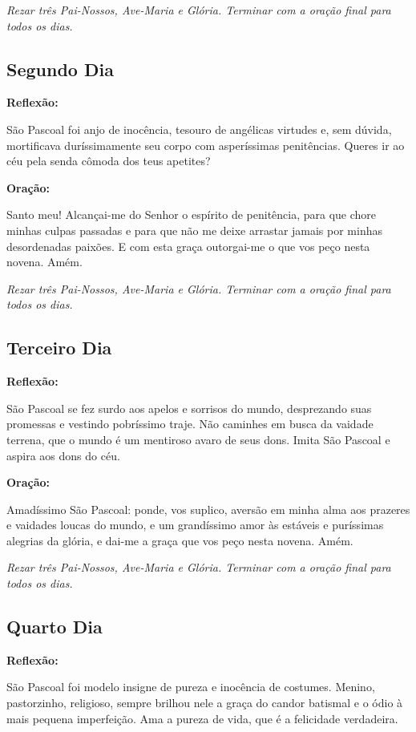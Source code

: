 \documentclass[18pt]{article}
\begin{document}
\textit{Rezar três Pai-Nossos, Ave-Maria e Glória. Terminar com a oração final para todos os dias.}

\subsection*{Segundo Dia}
\textbf{Reflexão:}

São Pascoal foi anjo de inocência, tesouro de angélicas virtudes e, sem dúvida, mortificava duríssimamente seu corpo com asperíssimas penitências. Queres ir ao céu pela senda cômoda dos teus apetites?

\textbf{Oração:}

Santo meu! Alcançai-me do Senhor o espírito de penitência, para que chore minhas culpas passadas e para que não me deixe arrastar jamais por minhas desordenadas paixões. E com esta graça outorgai-me o que vos peço nesta novena. Amém.

\textit{Rezar três Pai-Nossos, Ave-Maria e Glória. Terminar com a oração final para todos os dias.}

\subsection*{Terceiro Dia}
\textbf{Reflexão:}

São Pascoal se fez surdo aos apelos e sorrisos do mundo, desprezando suas promessas e vestindo pobríssimo traje. Não caminhes em busca da vaidade terrena, que o mundo é um mentiroso avaro de seus dons. Imita São Pascoal e aspira aos dons do céu.

\textbf{Oração:}

Amadíssimo São Pascoal: ponde, vos suplico, aversão em minha alma aos prazeres e vaidades loucas do mundo, e um grandíssimo amor às estáveis e puríssimas alegrias da glória, e dai-me a graça que vos peço nesta novena. Amém.

\textit{Rezar três Pai-Nossos, Ave-Maria e Glória. Terminar com a oração final para todos os dias.}

\subsection*{Quarto Dia}
\textbf{Reflexão:}

São Pascoal foi modelo insigne de pureza e inocência de costumes. Menino, pastorzinho, religioso, sempre brilhou nele a graça do candor batismal e o ódio à mais pequena imperfeição. Ama a pureza de vida, que é a felicidade verdadeira.
\end{document}
